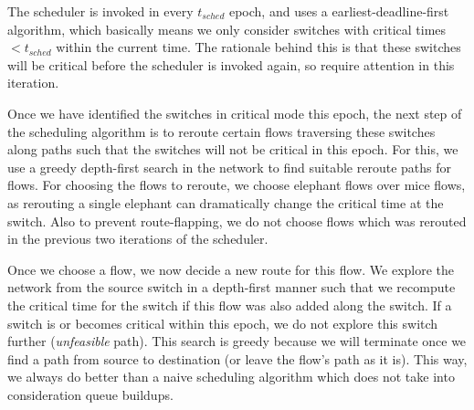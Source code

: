 The scheduler is invoked in every $t_{sched}$ epoch, and uses a 
earliest-deadline-first algorithm, which basically means we only consider
switches with critical times $< t_{sched}$ within the current time. The rationale 
behind this is that these switches will be critical before the scheduler is invoked 
again, so require attention in this iteration. 

Once we have identified the switches in critical mode this epoch,
the next step of the scheduling algorithm is to reroute certain flows 
traversing these switches along paths 
such that the switches will not be critical in this epoch. For this, we use 
a greedy depth-first search in the network to find suitable reroute paths for
flows. For choosing the flows to reroute, we choose elephant flows over mice flows,
as rerouting a single elephant can dramatically change the critical time at the switch.
Also to prevent route-flapping, we do not choose flows which was rerouted in the previous
two iterations of the scheduler. 

Once we choose a flow, we now decide a new route for this flow. We explore the 
network from the source switch in a depth-first manner such that we recompute the
critical time for the switch if this flow was also added along the switch. If a switch 
is or becomes critical within this epoch, we do not explore this switch further (\emph{unfeasible} path). This search is greedy because we will terminate once we find a path from source
 to destination (or leave the flow's path as it is). This way, we always do better than 
 a naive scheduling algorithm which does not take into consideration queue buildups.  












